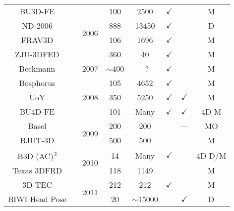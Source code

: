 \begin{table}[]
{\begin{tabular}{@{}cccccccc@{}}
BU3D-FE                    &\cite{Yin:2006cc}              & \multirow{4}{*}{2006} & 100         & 2500        & $\checkmark$ &              & M      \\
ND-2006                    &\cite{faltemier2007using}      &                       & 888         & 13450       & $\checkmark$ &              & D      \\
FRAV3D                     &\cite{conde2006multimodal}     &                       & 106         & 1696        & $\checkmark$ &              & M      \\
ZJU-3DFED                  &\cite{wang2006exploring}       &                       & 360         & 40          & $\checkmark$ &              & M      \\ \midrule
Beckmann                   &\cite{hu2007building}          & 2007                  & $\sim$400   &~?           & $\checkmark$ &              & M      \\ \midrule
Bosphorus                  &\cite{Savran:2008gg}           & \multirow{3}{*}{2008} & 105         & 4652        & $\checkmark$ &              & M      \\
UoY                        &\cite{heseltine2008three}      &                       & 350         & 5250        & $\checkmark$ & $\checkmark$ & M      \\
BU4D-FE                    &\cite{yin2008high}             &                       & 101         & Many        & $\checkmark$ & $\checkmark$ & 4D M   \\ \midrule
Basel                      &\cite{paysan20093d}            & \multirow{2}{*}{2009} & 200         & 200         &              & ---          & MO     \\
BJUT-3D                    &\cite{baocai2009bjut}          &                       & 500         & 500         &              &              & M      \\ \midrule
B3D (AC)\textsuperscript{2} &\cite{fanelli20103}            & \multirow{2}{*}{2010} & 14          & Many        & $\checkmark$ &              & 4D D/M \\
Texas 3DFRD                &\cite{gupta2010anthropometric} &                       & 118         & 1149        &              &              & M      \\ \midrule
3D-TEC                     &\cite{vijayan2011twins}        & \multirow{3}{*}{2011} & 212         & 212         & $\checkmark$ &              & M      \\
BIWI Head Pose             &\cite{fanelli2013random}       &                       & 20          & $\sim$15000 &              & $\checkmark$ & D      \\

\end{tabular}}
\end{table}
